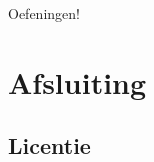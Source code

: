 \documentclass[
    dutch,
    everyoneauthor=true,
    defaultSlideCollection=vincent,
]{../../cursuspresentatie}
\begin{document}
\begin{frame}
    \begin{center}
        {\LARGE Oefeningen!}
        \vspace{30pt}


        

    \end{center}
\end{frame}

\section{Afsluiting}




% 

% 

% 

% 

% 


% 

\subsection{Licentie}
    
\end{document}
